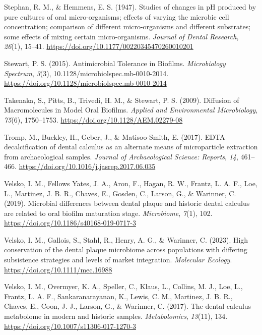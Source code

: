 \documentclass[
  b5paper,
]{book}
\newlength{\cslhangindent}
\newlength{\cslentryspacingunit} %
\newenvironment{CSLReferences}[2] %
 {%
  \setlength{\parindent}{0pt}
  \ifodd #1
  \let\oldpar\par
  \def\par{\hangindent=\cslhangindent\oldpar}
  \fi
  \setlength{\parskip}{#2\cslentryspacingunit}
 }%
 {}
\begin{document}
\begin{CSLReferences}{1}{0}
\leavevmode{}%
Stephan, R. M., \& Hemmens, E. S. (1947). Studies of changes in {pH}
produced by pure cultures of oral micro-organisms; effects of varying
the microbic cell concentration; comparison of different micro-organisms
and different substrates; some effects of mixing certain
micro-organisms. \emph{Journal of Dental Research}, \emph{26}(1),
15--41. \url{https://doi.org/10.1177/00220345470260010201}

\leavevmode{}%
Stewart, P. S. (2015). Antimicrobial {Tolerance} in {Biofilms}.
\emph{Microbiology Spectrum}, \emph{3}(3),
10.1128/microbiolspec.mb-0010-2014.
\url{https://doi.org/10.1128/microbiolspec.mb-0010-2014}

\leavevmode{}%
Takenaka, S., Pitts, B., Trivedi, H. M., \& Stewart, P. S. (2009).
Diffusion of {Macromolecules} in {Model Oral Biofilms}. \emph{Applied
and Environmental Microbiology}, \emph{75}(6), 1750--1753.
\url{https://doi.org/10.1128/AEM.02279-08}

\leavevmode{}%
Tromp, M., Buckley, H., Geber, J., \& Matisoo-Smith, E. (2017). {EDTA}
decalcification of dental calculus as an alternate means of
microparticle extraction from archaeological samples. \emph{Journal of
Archaeological Science: Reports}, \emph{14}, 461--466.
\url{https://doi.org/10.1016/j.jasrep.2017.06.035}

\leavevmode{}%
Velsko, I. M., Fellows Yates, J. A., Aron, F., Hagan, R. W., Frantz, L.
A. F., Loe, L., Martinez, J. B. R., Chaves, E., Gosden, C., Larson, G.,
\& Warinner, C. (2019). Microbial differences between dental plaque and
historic dental calculus are related to oral biofilm maturation stage.
\emph{Microbiome}, \emph{7}(1), 102.
\url{https://doi.org/10.1186/s40168-019-0717-3}

\leavevmode{}%
Velsko, I. M., Gallois, S., Stahl, R., Henry, A. G., \& Warinner, C.
(2023). High conservation of the dental plaque microbiome across
populations with differing subsistence strategies and levels of market
integration. \emph{Molecular Ecology}.
\url{https://doi.org/10.1111/mec.16988}

\leavevmode{}%
Velsko, I. M., Overmyer, K. A., Speller, C., Klaus, L., Collins, M. J.,
Loe, L., Frantz, L. A. F., Sankaranarayanan, K., Lewis, C. M., Martinez,
J. B. R., Chaves, E., Coon, J. J., Larson, G., \& Warinner, C. (2017).
The dental calculus metabolome in modern and historic samples.
\emph{Metabolomics}, \emph{13}(11), 134.
\url{https://doi.org/10.1007/s11306-017-1270-3}


\end{CSLReferences}
\end{document}
